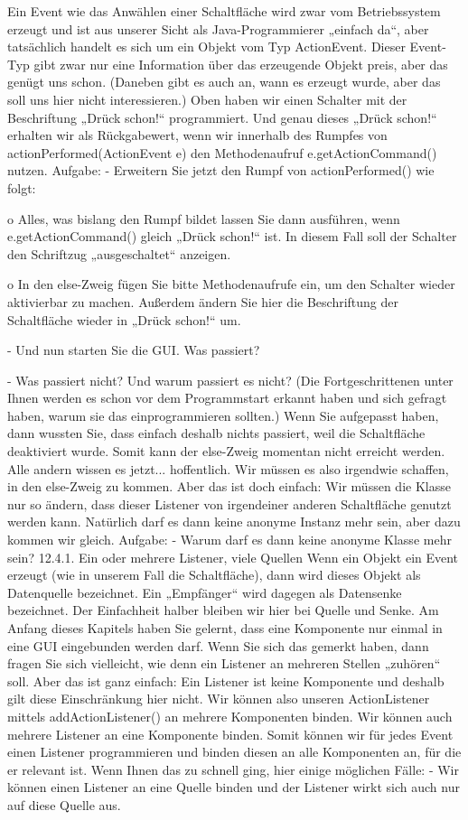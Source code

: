 Ein Event wie das Anwählen einer Schaltfläche wird zwar vom Betriebssystem erzeugt und ist aus unserer Sicht als Java-Programmierer „einfach da“, aber tatsächlich handelt es sich um ein Objekt vom Typ ActionEvent. Dieser Event-Typ gibt zwar nur eine Information über das erzeugende Objekt preis, aber das genügt uns schon. (Daneben gibt es auch an, wann es erzeugt wurde, aber das soll uns hier nicht interessieren.)
Oben haben wir einen Schalter mit der Beschriftung „Drück schon!“ programmiert. Und genau dieses „Drück schon!“ erhalten wir als Rückgabewert, wenn wir innerhalb des Rumpfes von actionPerformed(ActionEvent e) den Methodenaufruf e.getActionCommand() nutzen.
Aufgabe:
-	Erweitern Sie jetzt den Rumpf von actionPerformed() wie folgt:

o	Alles, was bislang den Rumpf bildet lassen Sie dann ausführen, wenn e.getActionCommand() gleich „Drück schon!“ ist. In diesem Fall soll der Schalter den Schriftzug „ausgeschaltet“ anzeigen.

o	In den else-Zweig fügen Sie bitte Methodenaufrufe ein, um den Schalter wieder aktivierbar zu machen. Außerdem ändern Sie hier die Beschriftung der Schaltfläche wieder in „Drück schon!“ um.

-	Und nun starten Sie die GUI. Was passiert?

-	Was passiert nicht? Und warum passiert es nicht? (Die Fortgeschrittenen unter Ihnen werden es schon vor dem Programmstart erkannt haben und sich gefragt haben, warum sie das einprogrammieren sollten.)
Wenn Sie aufgepasst haben, dann wussten Sie, dass einfach deshalb nichts passiert, weil die Schaltfläche deaktiviert wurde. Somit kann der else-Zweig momentan nicht erreicht werden. Alle andern wissen es jetzt... hoffentlich.
Wir müssen es also irgendwie schaffen, in den else-Zweig zu kommen. Aber das ist doch einfach: Wir müssen die Klasse nur so ändern, dass dieser Listener von irgendeiner anderen Schaltfläche genutzt werden kann. Natürlich darf es dann keine anonyme Instanz mehr sein, aber dazu kommen wir gleich.
Aufgabe:
-	Warum darf es dann keine anonyme Klasse mehr sein?
12.4.1.	Ein oder mehrere Listener, viele Quellen
Wenn ein Objekt ein Event erzeugt (wie in unserem Fall die Schaltfläche), dann wird dieses Objekt als Datenquelle bezeichnet. Ein „Empfänger“ wird dagegen als Datensenke bezeichnet. Der Einfachheit halber bleiben wir hier bei Quelle und Senke.
Am Anfang dieses Kapitels haben Sie gelernt, dass eine Komponente nur einmal in eine GUI eingebunden werden darf. Wenn Sie sich das gemerkt haben, dann fragen Sie sich vielleicht, wie denn ein Listener an mehreren Stellen „zuhören“ soll. Aber das ist ganz einfach: Ein Listener ist keine Komponente und deshalb gilt diese Einschränkung hier nicht. Wir können also unseren ActionListener mittels addActionListener() an mehrere Komponenten binden. Wir können auch mehrere Listener an eine Komponente binden. Somit können wir für jedes Event einen Listener programmieren und binden diesen an alle Komponenten an, für die er relevant ist.
Wenn Ihnen das zu schnell ging, hier einige möglichen Fälle:
-	Wir können einen Listener an eine Quelle binden und der Listener wirkt sich auch nur auf diese Quelle aus.

